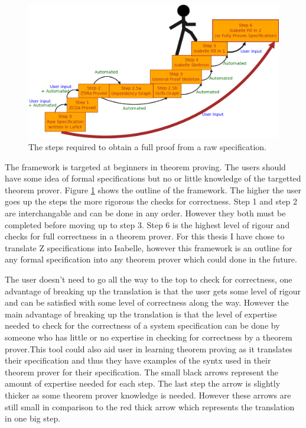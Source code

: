 \begin{figure}[H]
 \begin{center}
 \includegraphics [width=12cm]{Figures/Design/mathlangsteps.png}
 \caption{The steps required to obtain a full proof from a raw specification.}
 \label{fig:steps}
\end{center}
\end{figure} 

The framework is targeted at beginners in theorem proving. The users should have some idea of formal specifications but no or little knowledge of the targetted theorem prover. Figure \ref{fig:steps} shows the outline of the framework. The higher the user goes up the steps the more rigorous the checks for correctness. Step 1 and step 2 are interchangable and can be done in any order. However they both must be completed before moving up to step 3. Step 6 is the highest level of rigour and checks for full correctness in a theorem prover. For this thesis I have chose to translate Z specifications into Isabelle, however this framework is an outline for any formal specification into any theorem prover which could done in the future.

The user doesn't need to go all the way to the top to check for correctness, one advantage of breaking up the translation is that the user gets some level of rigour and can be satisfied with some level of correctness along the way. However the main advantage of breaking up the translation is that the level of expertise needed to check for the correctness of a system specification can be done by someone who has little or no expertise in checking for correctness by a theorem prover.This tool could also aid user in learning theorem proving as it translates their specification and thus they have examples of the syntx used in their theorem prover for their specification. The small black arrows represent the amount of expertise needed for each step. The last step the arrow is slightly thicker as some theorem prover knowledge is needed. However these arrows are still small in comparison to the red thick arrow which represents the translation in one big step.

